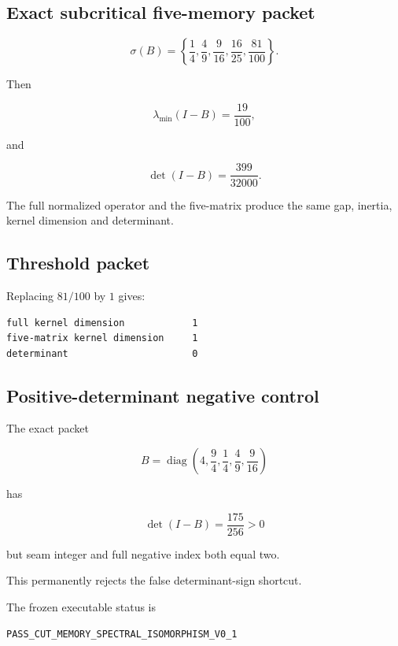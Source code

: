 \hypertarget{exact-subcritical-five-memory-packet}{%
\subsection{Exact subcritical five-memory packet}\label{exact-subcritical-five-memory-packet}}

\[
\sigma(B)
=
\left\{
\frac14,\frac49,\frac9{16},\frac{16}{25},\frac{81}{100}
\right\}.
\]

Then

\[
\lambda_{\min}(I-B)=\frac{19}{100},
\]

and

\[
\det(I-B)=\frac{399}{32000}.
\]

The full normalized operator and the five-matrix produce the same gap, inertia,
kernel dimension and determinant.

\hypertarget{threshold-packet}{%
\subsection{Threshold packet}\label{threshold-packet}}

Replacing \(81/100\) by \(1\) gives:

\begin{verbatim}
full kernel dimension            1
five-matrix kernel dimension     1
determinant                      0
\end{verbatim}

\hypertarget{positive-determinant-negative-control}{%
\subsection{Positive-determinant negative control}\label{positive-determinant-negative-control}}

The exact packet

\[
B=\operatorname{diag}
\left(
4,\frac94,\frac14,\frac49,\frac9{16}
\right)
\]

has

\[
\det(I-B)=\frac{175}{256}>0
\]

but seam integer and full negative index both equal two.

This permanently rejects the false determinant-sign shortcut.

The frozen executable status is

\begin{verbatim}
PASS_CUT_MEMORY_SPECTRAL_ISOMORPHISM_V0_1
\end{verbatim}

